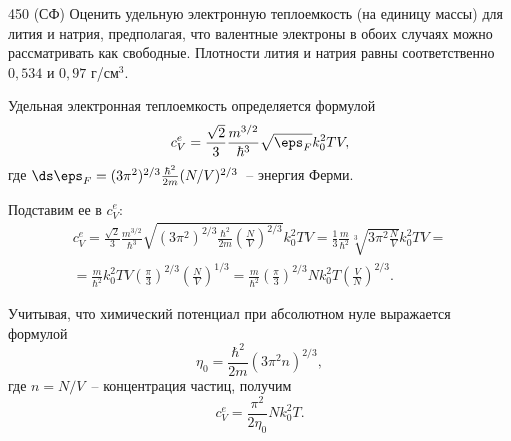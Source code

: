 \documentclass[pscyr]{hedwork}
\begin{document}
  \begin{task*}{450 (СФ)}{
    Оценить удельную электронную теплоемкость (на единицу массы) для лития и
    натрия, предполагая, что валентные электроны в обоих случаях можно
    рассматривать как свободные. Плотности лития и натрия равны соответственно
    \( 0,\!534 \) и \( 0,\!97 \) г/см\( ^3 \).
  }
  
    Удельная электронная теплоемкость определяется формулой
    \[
      c_V^e = \frac{\sqrt{2}}{3} \frac{m^{3/2}}{\hbar^3} \sqrt{\eps_F}
        k_0^2 TV,
    \]
    где \( \ds \eps_F = (3\pi^2)^{2/3}\frac{\hbar^2}{2m} (N / V)^{2/3} \)~--
    энергия Ферми.
    
    Подставим ее в \( c_V^e \):
    \begin{gather*}
      c_V^e = \frac{\sqrt{2}}{3}\frac{m^{3/2}}{\hbar^3}
        \sqrt{(3\pi^2)^{2/3}\frac{\hbar^2}{2m}\left(\frac{N}{V}\right)^{2/3}}
        k_0^2 TV = \frac{1}{3} \frac{m}{\hbar^2} \sqrt[3]{3\pi^2 \frac{N}{V}}
        k_0^2 TV = \\
      = \frac{m}{\hbar^2}k_0^2TV \left(\frac{\pi}{3}\right)^{2/3}
        \left(\frac{N}{V}\right)^{1/3} =
        \frac{m}{\hbar^2}\left(\frac{\pi}{3}\right)^{2/3}
        Nk_0^2T\left(\frac{V}{N}\right)^{2/3}.
    \end{gather*}

    Учитывая, что химический потенциал при абсолютном нуле выражается формулой
    \[
      \eta_0 = \frac{\hbar^2}{2m}(3\pi^2n)^{2/3}, 
    \]
    где \( n = N / V \)~-- концентрация частиц, получим
    \[
      c_V^e = \frac{\pi^2}{2\eta_0} Nk_0^2T.
    \]

  \end{task*}
\end{document}

